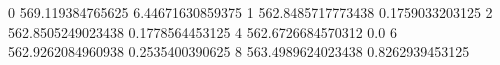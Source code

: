 0 569.119384765625 6.44671630859375
1 562.8485717773438 0.1759033203125
2 562.8505249023438 0.1778564453125
4 562.6726684570312 0.0
6 562.9262084960938 0.2535400390625
8 563.4989624023438 0.8262939453125
